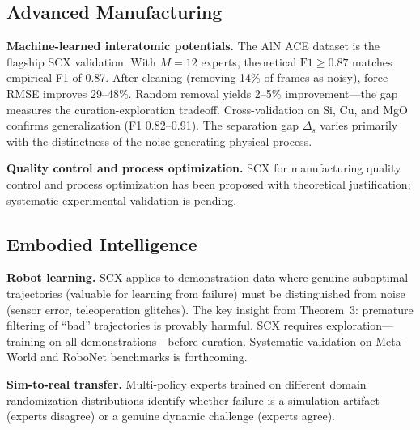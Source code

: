 \documentclass[twocolumn]{article}
\theoremstyle{definition}
\begin{document}
\vspace{0.3cm}
\subsection{Advanced Manufacturing}

\textbf{Machine-learned interatomic potentials.} The AlN ACE dataset is the flagship SCX validation. With $M=12$ experts, theoretical $\mathrm{F1} \geq 0.87$ matches empirical F1 of 0.87. After cleaning (removing 14\% of frames as noisy), force RMSE improves 29--48\%. Random removal yields 2--5\% improvement---the gap measures the curation-exploration tradeoff. Cross-validation on Si, Cu, and MgO confirms generalization (F1 0.82--0.91). The separation gap $\Delta_s$ varies primarily with the distinctness of the noise-generating physical process.

\textbf{Quality control and process optimization.} SCX for manufacturing quality control and process optimization has been proposed with theoretical justification; systematic experimental validation is pending.

\vspace{0.3cm}
\subsection{Embodied Intelligence}

\textbf{Robot learning.} SCX applies to demonstration data where genuine suboptimal trajectories (valuable for learning from failure) must be distinguished from noise (sensor error, teleoperation glitches). The key insight from Theorem~3: premature filtering of ``bad'' trajectories is provably harmful. SCX requires exploration---training on all demonstrations---before curation. Systematic validation on Meta-World and RoboNet benchmarks is forthcoming.

\textbf{Sim-to-real transfer.} Multi-policy experts trained on different domain randomization distributions identify whether failure is a simulation artifact (experts disagree) or a genuine dynamic challenge (experts agree).

\vspace{0.3cm}
\end{document}
